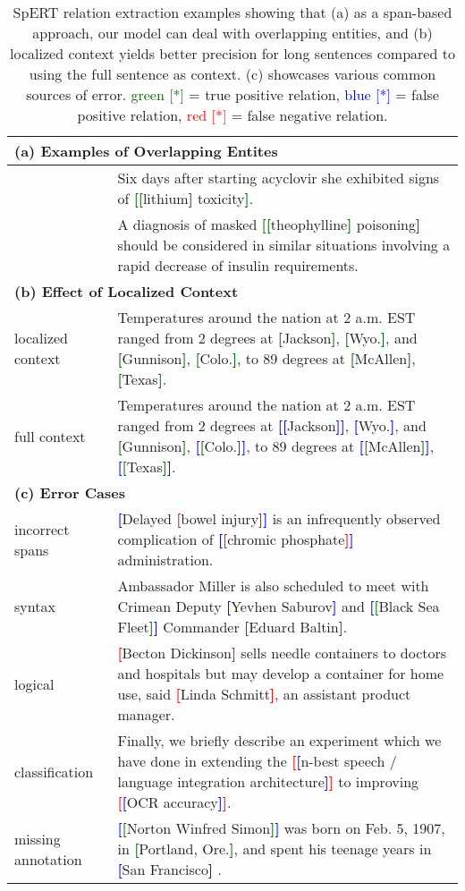 \documentclass{ecai}
\newcommand\bb[1]{\textbf{\textcolor{blue}{[}}{#1}\textbf{\textcolor{blue}{]}}}
\newcommand\rb[1]{\textbf{\textcolor{red}{[}}{#1}\textbf{\textcolor{red}{]}}}
\newcommand\gb[1]{\textbf{\textcolor{darkgreen}{[}}{#1}\textbf{\textcolor{darkgreen}{]}}}
\begin{document}
\begin{table*}
\centering
\begin{tabular}{l p{14.4cm}}
\toprule
    \multicolumn{2}{l}{{\bf (a) Examples of Overlapping Entites}} \\ \midrule
& Six days after starting acyclovir she exhibited signs of \gb{\gb{lithium} toxicity}.  \\ \midrule
& A diagnosis of masked \gb{\gb{theophylline} poisoning} should be considered in similar situations involving a rapid decrease of insulin requirements. \\
    \midrule
    \midrule
    \multicolumn{2}{l}{{\bf (b) Effect of Localized Context}} \\ \midrule     localized context 
    &  Temperatures around the nation at 2 a.m. EST ranged from 2 degrees at \gb{Jackson}, \gb{Wyo.}, and \gb{Gunnison}, \gb{Colo.}, to 89 degrees at \gb{McAllen}, \gb{Texas}. \\ \midrule
     full context &  Temperatures around the nation at 2 a.m. EST ranged from 2 degrees at \bb{\bb{Jackson}}, \bb{Wyo.}, and \gb{Gunnison}, \bb{\gb{Colo.}}, to 89 degrees at \bb{\gb{McAllen}}, \bb{\gb{Texas}}. \\
    \midrule
    \midrule
    \multicolumn{2}{l}{{\bf (c) Error Cases}} \\ \midrule           incorrect spans & \bb{Delayed \rb{bowel injury}} is an infrequently observed complication of \bb{\rb{chromic phosphate}} administration.\\ \midrule
           


       syntax & Ambassador Miller is also scheduled to meet with Crimean Deputy \bb{Yevhen Saburov} and \bb{\gb{Black Sea Fleet}} Commander \gb{Eduard Baltin}.\\ \midrule
       
      logical &  \rb{Becton Dickinson} sells needle containers to doctors and hospitals but may develop a container for home use, said \rb{Linda Schmitt}, an assistant product manager.\\ \midrule
       
      classification & Finally, we briefly describe an experiment which we have done in extending the  \rb{\bb{n-best speech / language integration architecture}} to improving \rb{\bb{OCR accuracy}}. \\ \midrule
           missing annotation & \bb{\gb{Norton Winfred Simon}} was born on Feb. 5, 1907, in \gb{Portland, Ore.}, and spent his teenage years in \bb{San Francisco} .\\
     \bottomrule
\end{tabular}
\caption[]{SpERT relation extraction examples showing that (a) as a span-based approach, our model can deal with overlapping entities, and (b) localized context yields better precision for long sentences compared to using the full sentence as context. (c) showcases various common sources of error.
\textcolor{darkgreen}{green [*]} = true positive relation, \textcolor{blue}{blue [*]} = false positive relation, \textcolor{red}{red [*]} = false negative relation.} 
\label{table:examples} 
\end{table*}
\end{document}
